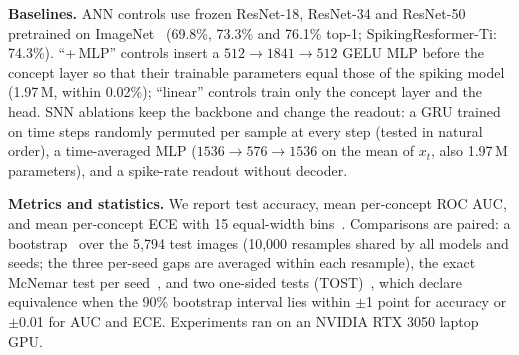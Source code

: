 \documentclass[conference]{IEEEtran}
\begin{document}
\textbf{Baselines.} ANN controls use frozen ResNet-18, ResNet-34 and ResNet-50~\cite{he2016deep} pretrained on ImageNet~\cite{deng2009imagenet} (69.8\%, 73.3\% and 76.1\% top-1; SpikingResformer-Ti: 74.3\%). ``+\,MLP'' controls insert a $512\!\to\!1841\!\to\!512$ GELU MLP before the concept layer so that their trainable parameters equal those of the spiking model (1.97\,M, within 0.02\%); ``linear'' controls train only the concept layer and the head. SNN ablations keep the backbone and change the readout: a GRU trained on time steps randomly permuted per sample at every step (tested in natural order), a time-averaged MLP ($1536\!\to\!576\!\to\!1536$ on the mean of $x_t$, also 1.97\,M parameters), and a spike-rate readout without decoder.

\textbf{Metrics and statistics.} We report test accuracy, mean per-concept ROC AUC, and mean per-concept ECE with 15 equal-width bins~\cite{naeini2015obtaining}. Comparisons are paired: a bootstrap~\cite{efron1993introduction} over the 5,794 test images (10,000 resamples shared by all models and seeds; the three per-seed gaps are averaged within each resample), the exact McNemar test per seed~\cite{mcnemar1947note}, and two one-sided tests (TOST)~\cite{schuirmann1987comparison}, which declare equivalence when the 90\% bootstrap interval lies within $\pm$1 point for accuracy or $\pm$0.01 for AUC and ECE. Experiments ran on an NVIDIA RTX 3050 laptop GPU.
\end{document}
